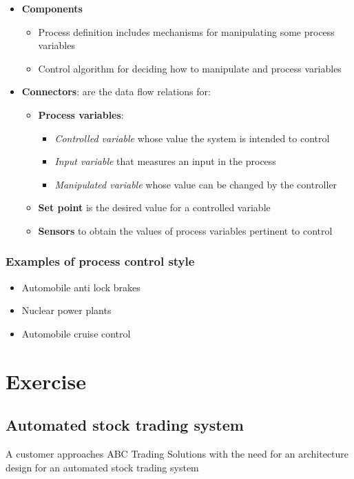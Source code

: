\documentclass[12pt]{book}
\begin{document}
\begin{itemize}
    \item \textbf{Components}
    \begin{itemize}
        \item Process definition includes mechanisms for manipulating some process variables
        \item Control algorithm for deciding how to manipulate and process variables
    \end{itemize} 

    \item \textbf{Connectors}: are the data flow relations for:
    \begin{itemize}
        \item \textbf{Process variables}:
        \begin{itemize}
            \item \textit{Controlled variable} whose value the system is intended to control
            \item \textit{Input variable} that measures an input in the process 
            \item \textit{Manipulated variable} whose value can be changed by the controller
        \end{itemize} 

        \item \textbf{Set point} is the desired value for a controlled variable
        \item \textbf{Sensors} to obtain the values of process variables pertinent to control
    \end{itemize} 
\end{itemize}

\subsection{Examples of process control style}

\begin{itemize}
    \item Automobile anti lock brakes
    \item Nuclear power plants
    \item Automobile cruise control
\end{itemize}

\chapter{Exercise}

\section{Automated stock trading system}
A customer approaches ABC Trading Solutions with the need for an architecture design for an automated stock trading system
\end{document}
